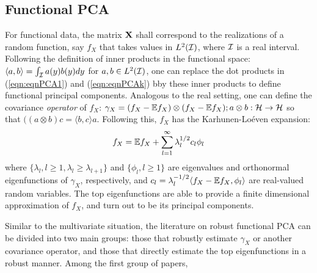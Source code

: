 \subsection*{\sffamily \large Functional PCA}
For functional data, the matrix ${\mathbf{X}}$ shall correspond to the realizations of a random function, say $f_X$ that takes values in $L^2 ({\cal{I}})$, where ${\cal{I}}$ is a real interval. Following the definition of inner products in the functional space: $ \langle a, b \rangle = \int_{\cal{I}} a(y) b(y) dy$ for $a,b \in L^2 ({\cal{I}})$, one can replace the dot products in (\ref{eqn:eqnPCA1}) and (\ref{eqn:eqnPCAk}) bby these inner products to define functional principal components. Analogous to the real setting, one can define the covariance {\it operator} of $f_X$: $\gamma_X = (f_X - {\mathbb{E}} f_X) \otimes (f_X - {\mathbb{E}} f_X); a \otimes b: {\cal{H}} \rightarrow {\cal{H}}$ so that $((a \otimes b)c = \langle b,c \rangle a$. Following this, $f_X$ has the Karhunen-Lo\'{e}ven expansion:
%
$$
f_X = {\mathbb{E}} f_X + \sum_{l=1}^\infty \lambda_l^{1/2} c_l \phi_l
$$
%
where $\{ \lambda_l, l \geq 1, \lambda_l \geq \lambda_{l+1} \}$ and $\{ \phi_l, l \geq 1\}$ are eigenvalues and orthonormal eigenfunctions of $\gamma_X$, respectively, and $c_l = \lambda_l^{-1/2}  \langle f_X - {\mathbb{E}} f_X , \phi_l\rangle$ are real-valued random variables. The top eigenfunctions are able to provide a finite dimensional approximation of $f_X$, and turn out to be its principal components.

Similar to the multivariate situation, the literature on robust functional PCA can be divided into two main groups: those that robustly estimate $\gamma_X$ or another covariance operator, and those that directly estimate the top eigenfunctions in a robust manner. Among the first group of papers, 
